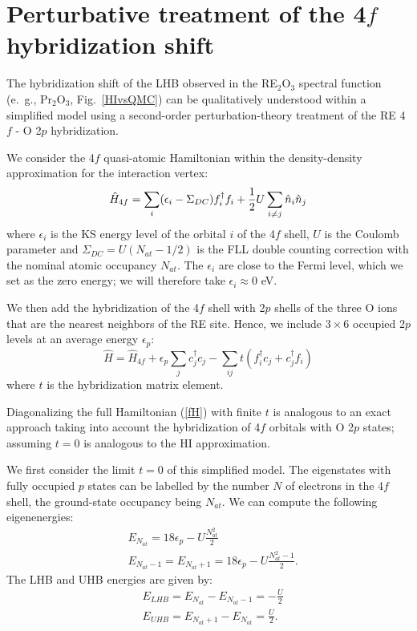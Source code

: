 \documentclass[aps,prb,twocolumn,amsmath,amssymb]{revtex4}
\begin{document}
\section{Perturbative treatment of the 4$f$ hybridization shift}


The hybridization shift of the LHB  observed in the RE$_2$O$_3$ spectral function (e.~g., Pr$_2$O$_3$, Fig.~\ref{HIvsQMC}) can be qualitatively understood within a simplified model using a second-order perturbation-theory treatment of the RE 4$f$ - O 2$p$ hybridization. 

We consider the 4$f$ quasi-atomic Hamiltonian within the density-density approximation for the interaction vertex: 
\begin{equation}
\label{H}
    \hat{H}_{4f} =\sum_{i}(\epsilon_{i}-\Sigma_{DC})f^{\dagger}_{i}f_{i}+\frac{1}{2}U \sum_{i\neq j}\hat{n}_{i}\hat{n}_{j}\\
\end{equation}
where $\epsilon_{i}$ is the KS energy level of the orbital $i$ of the 4$f$ shell, $U$ is the Coulomb parameter and $\Sigma_{DC}=U(N_{at}-1/2)$ is the FLL double counting correction with the nominal atomic occupancy $N_{at}$. The $\epsilon_{i}$ are close to the Fermi level, which we set as the zero energy; we will therefore take $\epsilon_{i}\approx 0$ eV.

We then add the hybridization of the 4$f$ shell  with 2$p$ shells of the three  O ions that are the nearest neighbors of the RE site. Hence, we include $3\times 6$ occupied 2$p$ levels at an average energy $\epsilon_{p}$:
\begin{equation}
\label{fH}
    \hat{H} =\hat{H}_{4f}+\epsilon_{p}\sum_{j}c^{\dagger}_{j}c_{j}-\sum_{ij}t(f^{\dagger}_{i}c_{j}+c^{\dagger}_{j}f_{i})
\end{equation}
where $t$ is the hybridization matrix element.

Diagonalizing the full Hamiltonian (\ref{fH}) with finite $t$ is analogous to an exact approach taking into account the hybridization of 4$f$ orbitals with O 2$p$ states; assuming $t=0$ is analogous to the HI approximation.


We first consider the limit $t=0$ of this simplified model. The eigenstates with fully occupied $p$ states can be labelled by the number $N$ of electrons in the 4$f$ shell, the ground-state occupancy being $N_{at}$. We can compute the following eigenenergies:
\begin{align*}
  &  E_{N_{at}}  = 18\epsilon_{p}-U\frac{N_{at}^{2}}{2}\\
   & E_{N_{at}-1}= E_{N_{at}+1} =18\epsilon_{p}-U\frac{N_{at}^{2}-1}{2}.
\end{align*}
The LHB and UHB energies are given by:
\begin{align*}
    & E_{LHB} =E_{N_{at}}-E_{N_{at}-1}= -\frac{U}{2}\\
    & E_{UHB} =E_{N_{at}+1}-E_{N_{at}}=\frac{U}{2}.
\end{align*}
\end{document}

